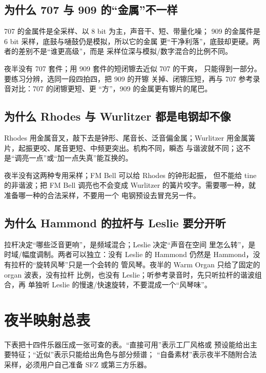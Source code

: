 \subsection{为什么 707 与 909 的“金属”不一样}
\label{sec:iconic-why-707-909}

707 的金属件是全采样、以 8 bit 为主，声音干、短、带量化噪；
909 的金属件是 6 bit 采样，底鼓与嗵鼓仍是模拟，所以它的金属
更“干净利落”，底鼓却更硬。两者的差别不是“谁更高级”，而是
采样位深与模拟/数字混合的比例不同。

夜半没有 707 套件；用 909 套件的短闭镲去近似 707 的干爽，
只能得到一部分。要练习分辨，选同一段四拍四，把 909 的开镲
关掉、闭镲压短，再与 707 参考录音对比：707 的闭镲更短、更
“方”，909 的金属更有镲片的尾巴。

\subsection{为什么 Rhodes 与 Wurlitzer 都是电钢却不像}
\label{sec:iconic-why-rhodes-wurli}

Rhodes 用金属音叉，敲下去是钟形、尾音长、泛音偏金属；Wurlitzer
用金属簧片，起振更咬、尾音更短、中频更突出。机构不同，瞬态
与谐波就不同；这不是“调亮一点”或“加一点失真”能互换的。

夜半没有这两种专用采样；FM Bell 可以给 Rhodes 的钟形起振，
但不能给 tine 的非谐波；把 FM Bell 调亮也不会变成 Wurlitzer
的簧片咬字。需要哪一种，就准备哪一种的合法采样，不要用一个
电钢预设去冒充另一件。

\subsection{为什么 Hammond 的拉杆与 Leslie 要分开听}
\label{sec:iconic-why-hammond}

拉杆决定“哪些泛音更响”，是频域混合；Leslie 决定“声音在空间
里怎么转”，是时域/幅度调制。两者可以独立：没有 Leslie 的
Hammond 仍然是 Hammond，没有拉杆的“旋转风琴”只是一个会转的
管风琴。夜半的 Warm Organ 只给了固定的 organ 波表，没有拉杆
比例，也没有 Leslie；听参考录音时，先只听拉杆的谐波组合，再
单独听 Leslie 的慢速/快速旋转，不要混成一个“风琴味”。

\section{夜半映射总表}
\label{sec:iconic-yeban-map}

下表把十四件乐器压成一张可查的表。“直接可用”表示工厂风格或
预设能给出主要特征；“近似”表示只能给出角色与部分频谱；
“自备素材”表示夜半不随附合法采样，必须用户自己准备 SFZ
或第三方乐器。

